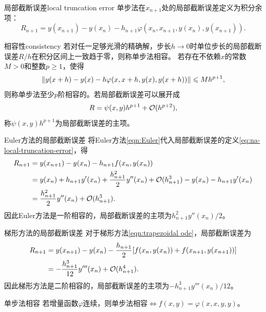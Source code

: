\begin{definition}
    {局部截断误差}{local truncation error}
    单步法在$x_{n+1}$处的局部截断误差定义为积分余项：
    \begin{equation}\label{eq:na-local-truncation-error}
        R_{n+1} = y(x_{n+1}) - y(x_n) - h_{n+1}\varphi(x_n,x_{n+1},y(x_n),y(x_{n+1})).
    \end{equation}
\end{definition}

\begin{definition}
    {相容性}{consistency}
    若对任一足够光滑的精确解，步长$h \to 0$时单位步长的局部截断误差$R/h$在积分区间上一致趋于零，则称单步法相容。
    \tcblower
    若存在不依赖$x$的常数$M > 0$和整数$p \geq 1$，使得
    \begin{equation}
        \lVert y(x + h) - y(x) - h\varphi(x,x + h,y(x),y(x + h))\rVert \leqslant Mh^{p+1},
    \end{equation}
    则称单步法至少$p$阶相容的。若局部截断误差可以展开成
    \begin{equation}\label{eq:na-principal-local-error}
        R = \psi(x,y)h^{p+1} + \mathcal{O}(h^{p+2}),
    \end{equation}
    称$\psi(x,y)h^{p+1}$为局部截断误差的主项。
\end{definition}

\begin{example}
    {Euler方法的局部截断误差}{}
    将Euler方法\eqref{eqn:Euler}代入局部截断误差的定义\eqref{eq:na-local-truncation-error}，得
    \begin{equation}\label{eq:na-euler-local-error}
        \begin{aligned}
            R_{n+1} &= y(x_{n+1}) - y(x_n) - h_{n+1}f(x_n,y(x_n))\\
            &= y(x_n) + h_{n+1}y'(x_n) + \frac{h_{n+1}^2}2y''(x_n) + \mathcal{O}(h_{n+1}^3) - y(x_n) - h_{n+1}y'(x_n)\\
            &= \frac{h_{n+1}^2}2y''(x_n) + \mathcal{O}(h_{n+1}^3).
        \end{aligned}
    \end{equation}
    因此Euler方法是一阶相容的，局部截断误差的主项为$h_{n+1}^2y''(x_n)/2$。
\end{example}

\begin{example}
    {梯形方法的局部截断误差}{}
    对于梯形方法\eqref{eqn:trapezoidal ode}，局部截断误差为
    \begin{equation}\label{eq:na-trapezoidal-local-error}
        \begin{aligned}
            R_{n+1} &= y(x_{n+1}) - y(x_n) - \frac{h_{n+1}}2[f(x_n,y(x_n)) + f(x_{n+1},y(x_{n+1}))]\\
            &= -\frac{h_{n+1}^3}{12}y'''(x_n) + \mathcal{O}(h_{n+1}^4).
        \end{aligned}
    \end{equation}
    因此梯形方法是二阶相容的，局部截断误差的主项为$-h_{n+1}^3y'''(x_n)/12$。
\end{example}

\begin{theorem}
    {单步法相容}{}
    若增量函数$\varphi$连续，则单步法相容$\iff f(x,y) = \varphi(x,x,y,y)$。
\end{theorem}

